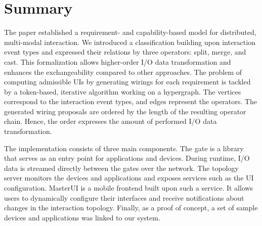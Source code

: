 \documentclass[twoside,twocolumn,10pt]{article}
\begin{document}
\section{Summary} \label{summary}

%
%
The paper established a requirement- and capability-based model for distributed, multi-modal interaction. We introduced a classification building upon interaction event types and expressed their relations by three operators: split, merge, and cast. This formalization allows higher-order I/O data transformation and enhances the exchangeability compared to other approaches. The problem of computing admissible UIs by generating wirings for each requirement is tackled by a token-based, iterative algorithm working on a hypergraph. The vertices correspond to the interaction event types, and edges represent the operators. The generated wiring proposals are ordered by the length of the resulting operator chain. Hence, the order expresses the amount of performed I/O data transformation.



%
%
The implementation consists of three main components.
The gate is a library that serves as an entry point for applications and devices.
During runtime, I/O data is streamed directly between the gates over the network.
The topology server monitors the devices and applications and exposes services such as the UI configuration.
MasterUI is a mobile frontend built upon such a service.
It allows users to dynamically configure their interfaces and receive notifications about changes in the interaction topology.
Finally, as a proof of concept, a set of sample devices and applications was linked to our system.





\end{document}
